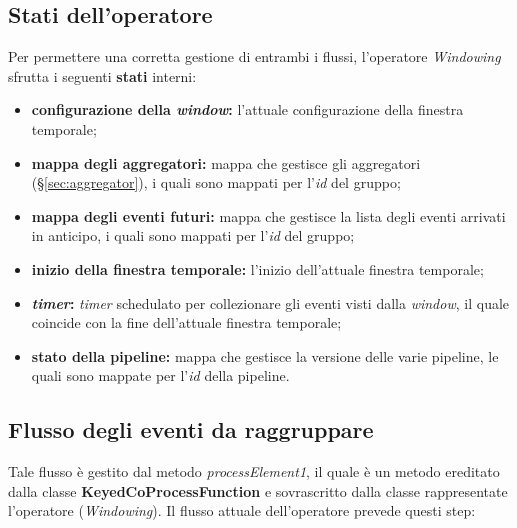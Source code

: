 \subsection{Stati dell'operatore}\label{sec:stati-windowing}
Per permettere una corretta gestione di entrambi i flussi, l'operatore \textit{Windowing} sfrutta i seguenti \textbf{stati} interni:
\begin{itemize}
		\item{\textbf{configurazione della \textit{window}:} l'attuale configurazione della finestra temporale;}
		\item{\textbf{mappa degli aggregatori:} mappa che gestisce gli aggregatori (\S\ref{sec:aggregator}), i quali sono mappati per l'\textit{id} del gruppo;}
		\item{\textbf{mappa degli eventi futuri:} mappa che gestisce la lista degli eventi arrivati in anticipo, i quali sono mappati per l'\textit{id} del gruppo;}
		\item{\textbf{inizio della finestra temporale:} l'inizio dell'attuale finestra temporale;}
		\item{\textbf{\textit{timer}:} \textit{timer} schedulato per collezionare gli eventi visti dalla \textit{window}, il quale coincide con la fine dell'attuale finestra temporale;}
		\item{\textbf{stato della \gls{pipeline}:} mappa che gestisce la versione delle varie \gls{pipeline}, le quali sono mappate per l'\textit{id} della \gls{pipeline}.}
\end{itemize}


\subsection{Flusso degli eventi da raggruppare}\label{sec:pr1-windowing}
Tale flusso è gestito dal metodo \textit{processElement1}, il quale è un metodo ereditato dalla classe \textbf{KeyedCoProcessFunction} e sovrascritto dalla classe rappresentate l'operatore (\textit{Windowing}). Il flusso attuale dell'operatore prevede questi step:


